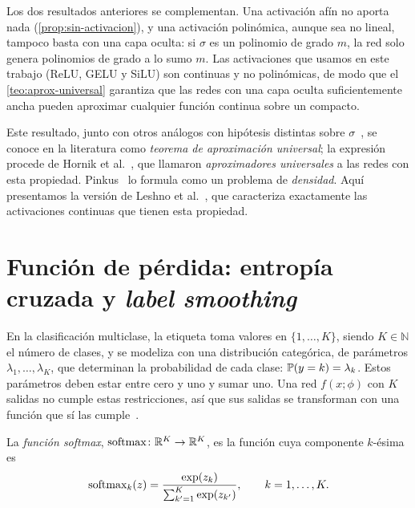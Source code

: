 \begin{observacion}
Los dos resultados anteriores se complementan. Una activación afín no aporta nada (\cref{prop:sin-activacion}), y una activación polinómica, aunque sea no lineal, tampoco basta con una capa oculta: si $\sigma$ es un polinomio de grado $m$, la red solo genera polinomios de grado a lo sumo $m$. Las activaciones que usamos en este trabajo (ReLU, GELU y SiLU) son continuas y no polinómicas, de modo que el \cref{teo:aprox-universal} garantiza que las redes con una capa oculta suficientemente ancha pueden aproximar cualquier función continua sobre un compacto.
\end{observacion}

Este resultado, junto con otros análogos con hipótesis distintas sobre $\sigma$~\cite{cybenko1989approximation,hornik1989multilayer}, se conoce en la literatura como \emph{teorema de aproximación universal}; la expresión procede de Hornik et al.~\cite{hornik1989multilayer}, que llamaron \emph{aproximadores universales} a las redes con esta propiedad. Pinkus~\cite{pinkus1999approximation} lo formula como un problema de \emph{densidad}. Aquí presentamos la versión de Leshno et al.~\cite{leshno1993multilayer}, que caracteriza exactamente las activaciones continuas que tienen esta propiedad.

\section{Función de pérdida: entropía cruzada y \emph{label smoothing}}\label{sec:perdida}

En la clasificación multiclase, la etiqueta toma valores en $\{1,\dots,K\}$, siendo $K \in \mathbb{N}$ el número de clases, y se
modeliza con una distribución categórica, de parámetros
$\lambda_1,\dots,\lambda_K$, que determinan la probabilidad de cada clase:
$\mathbb{P}(y = k) = \lambda_k$. Estos parámetros deben estar entre cero y uno y sumar
uno. Una red $f(x;\phi)$ con $K$ salidas no cumple estas restricciones, así que
sus salidas se transforman con una función que sí las
cumple~\cite[sec.~5.5]{prince2023understanding}.

\begin{definicion}\label{def:softmax}
La \emph{función softmax},
$\operatorname{softmax}\colon\mathbb{R}^{K}\to\mathbb{R}^{K}$, es la función cuya componente $k$-ésima es
\[
  \operatorname{softmax}_k(z) = \frac{\exp(z_k)}{\sum_{k'=1}^{K}\exp(z_{k'})},
  \qquad k = 1,\dots,K.
\]
\end{definicion}


